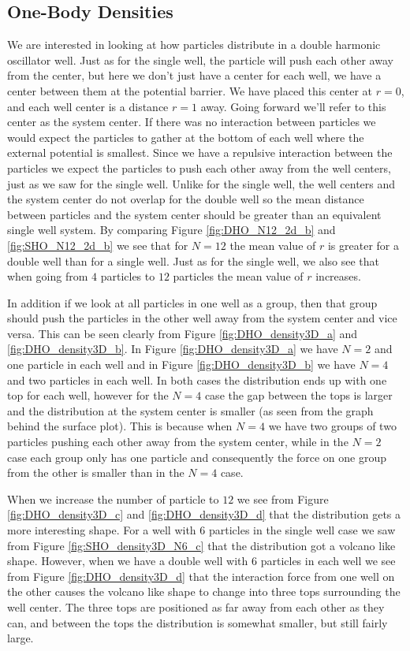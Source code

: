 \documentclass[../main.tex]{subfiles}
\begin{document}
\subsection{One-Body Densities}

We are interested in looking at how particles distribute in a double harmonic oscillator well. Just as for the single well, the particle will push each other away from the center, but here we don't just have a center for each well, we have a center between them at the potential barrier. We have placed this center at $r=0$, and each well center is a distance $r=1$ away. Going forward we'll refer to this center as the system center. If there was no interaction between particles we would expect the particles to gather at the bottom of each well where the external potential is smallest. Since we have a repulsive interaction between the particles we expect the particles to push each other away from the well centers, just as we saw for the single well. Unlike for the single well, the well centers and the system center do not overlap for the double well so the mean distance between particles and the system center should be greater than an equivalent single well system. By comparing Figure \ref{fig:DHO_N12_2d_b} and \ref{fig:SHO_N12_2d_b} we see that for $N=12$ the mean value of $r$ is greater for a double well than for a single well. Just as for the single well, we also see that when going from $4$ particles to $12$ particles the mean value of $r$ increases.

In addition if we look at all particles in one well as a group, then that group should push the particles in the other well away from the system center and vice versa. This can be seen clearly from Figure \ref{fig:DHO_density3D_a} and \ref{fig:DHO_density3D_b}. In Figure \ref{fig:DHO_density3D_a} we have $N=2$ and one particle in each well and in Figure \ref{fig:DHO_density3D_b} we have $N=4$ and two particles in each well. In both cases the distribution ends up with one top for each well, however for the $N=4$ case the gap between the tops is larger and the distribution at the system center is smaller (as seen from the graph behind the surface plot). This is because when $N=4$ we have two groups of two particles pushing each other away from the system center, while in the $N=2$ case each group only has one particle and consequently the force on one group from the other is smaller than in the $N=4$ case.

When we increase the number of particle to $12$ we see from Figure \ref{fig:DHO_density3D_c} and \ref{fig:DHO_density3D_d} that the distribution gets a more interesting shape. For a well with $6$ particles in the single well case we saw from Figure \ref{fig:SHO_density3D_N6_c} that the distribution got a volcano like shape. However, when we have a double well with $6$ particles in each well we see from Figure \ref{fig:DHO_density3D_d} that the interaction force from one well on the other causes the volcano like shape to change into three tops surrounding the well center. The three tops are positioned as far away from each other as they can, and between the tops the distribution is somewhat smaller, but still fairly large.
\end{document}
